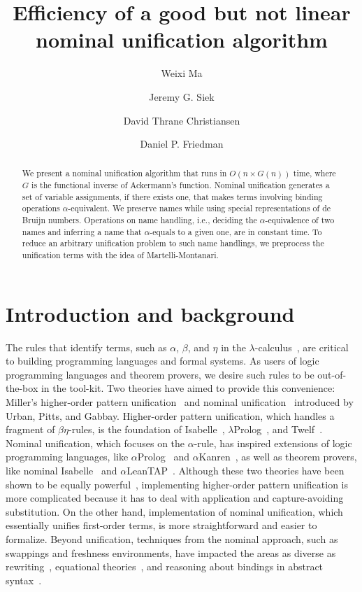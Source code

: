 \documentclass[a4paper,UKenglish]{lipics-v2016}
\title{Efficiency of a good but not linear nominal unification algorithm}
\author[1]{Weixi Ma}
\author[2]{Jeremy G. Siek}
\author[3]{David Thrane Christiansen}
\author[4]{Daniel P. Friedman}
\affil[1]{Indiana University,
  \texttt{mvc@iu.edu}}
\affil[2]{Indiana University,
  \texttt{jsiek@indiana.edu}}
\affil[3]{Galois, Inc.,
  \texttt{dtc@galois.com}}
\affil[4]{Indiana University,
  \texttt{dfried@indiana.edu}}
\begin{document}
\maketitle

\begin{abstract}
  We present a nominal unification algorithm
  that runs in $O(n \times G(n))$ time,
  where $G$ is the functional inverse of Ackermann's function.
  Nominal unification generates a set of variable assignments,
  if there exists one,
  that makes terms involving binding operations $\alpha$-equivalent.
  We preserve names while using special representations of de Bruijn numbers.
  Operations on name handling, i.e.,
  deciding the $\alpha$-equivalence of two names and
  inferring a name that $\alpha$-equals to a given one,
  are in constant time.
  To reduce an arbitrary unification problem to such name handlings,
  we preprocess the unification terms
  with the idea of Martelli-Montanari.
\end{abstract}

\section{Introduction and background}
The rules that identify terms, such as $\alpha$, $\beta$, and $\eta$
in the $\lambda$-calculus~\cite{church_calculi_1941},
are critical to building programming languages and formal systems.
As users of logic programming languages and theorem provers,
we desire such rules to be out-of-the-box in the tool-kit.
Two theories have aimed to provide this convenience:
Miller's higher-order pattern unification~\cite{miller_logic_1989} and
nominal unification~\cite{urban_nominal_2004} introduced by Urban, Pitts, and Gabbay.
Higher-order pattern unification, which handles a fragment of $\beta\eta$-rules,
is the foundation of Isabelle~\cite{paulson_natural_1986}, $\lambda$Prolog~\cite{nadathur_overview_1988}, and Twelf~\cite{pfenning_system_1999-1}.
Nominal unification, which focuses on the $\alpha$-rule,
has inspired extensions of logic programming languages, like $\alpha$Prolog~\cite{cheney_prolog:_2004} and $\alpha$Kanren~\cite{byrd_alphakanren:_2007},
as well as theorem provers, like nominal Isabelle~\cite{urban_nominal_2005} and $\alpha$LeanTAP~\cite{near_leantap:_2008}.
Although these two theories have been shown to be equally powerful~\cite{cheney_relating_2005, levy_nominal_2012},
implementing higher-order pattern unification is more complicated
because it has to deal with application and capture-avoiding substitution.
On the other hand, implementation of nominal unification,
which essentially unifies first-order terms,
is more straightforward and easier to formalize.
Beyond unification, techniques from the nominal approach,
such as swappings and freshness environments,
have impacted the areas as diverse as
rewriting~\cite{fernandez_nominal_2004, fernandez_nominal_2005, fernandez_nominal_2007, aoto_nominal_2016},
equational theories~\cite{ayala-rincon_nominal_2016},
and reasoning about bindings in abstract syntax~\cite{pitts_metalanguage_2000, gabbay_new_2002}.
\end{document}
